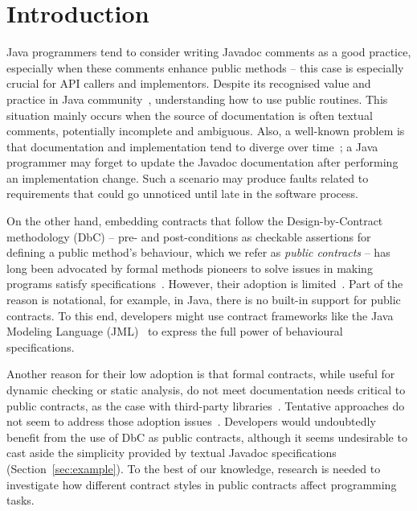 \section{Introduction}
\label{sec:introduction}

Java programmers tend to consider writing Javadoc comments as a good practice,
especially when these comments enhance public methods -- this case is especially crucial for API callers and implementors.
Despite its recognised value and practice in Java community~\cite{liveAPI},
understanding how to use public routines.
This situation mainly occurs when the source of documentation is often textual comments, potentially incomplete and ambiguous. Also, a well-known problem is that documentation and implementation tend to diverge over time~\cite{Estler-etal14}; 
a Java programmer may forget to update the Javadoc documentation after performing an implementation change. Such a scenario may produce faults related to requirements that could go unnoticed until late in the software process.

On the other hand, embedding contracts that follow the Design-by-Contract methodology (DbC) -- pre- and post-conditions as checkable assertions for defining a public method's behaviour, which we refer as \emph{public contracts} -- has
long been advocated by formal methods pioneers to solve issues in making programs satisfy specifications~\cite{Hoare1969,Parnas2011}. 
However, their adoption is limited~\cite{Polikarpova-etal09}. 
Part of the reason is notational, for example, in Java, there is no built-in support for public contracts.
To this end, developers might use contract frameworks like the Java Modeling Language (JML)~\cite{jml} to express the full power of behavioural specifications.

Another reason for their low adoption is that formal contracts, while useful for dynamic checking or static analysis, do not meet documentation needs critical to public contracts, as the case with third-party libraries~\cite{Leavens10,Parnas2011}. 
Tentative approaches do not seem to address those adoption issues~\cite{docAnalysis}.
Developers would undoubtedly benefit from the use of DbC as public contracts, although it seems undesirable to cast aside the simplicity provided by textual Javadoc specifications (Section~\ref{sec:example}).
To the best of our knowledge, research is needed to investigate how different contract styles in public contracts affect programming tasks.

